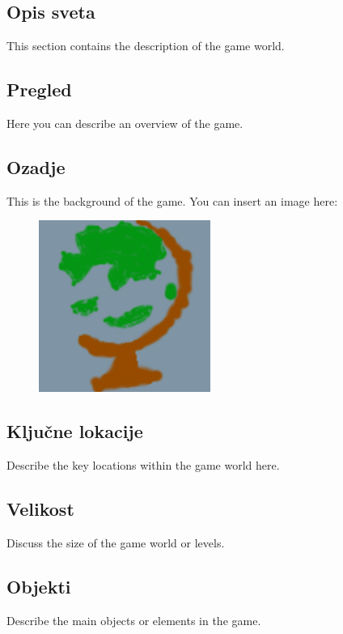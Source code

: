 \documentclass[a4paper, 12pt]{book}
\begin{document}
\subsection{Opis sveta}
\noindent This section contains the description of the game world.

\subsection{Pregled}
\noindent Here you can describe an overview of the game.

\subsection{Ozadje}
\noindent This is the background of the game. You can insert an image here:

\begin{figure}[h!]
    \centering
    \includegraphics[width=0.5\textwidth]{./slika.png}
\end{figure}

\subsection{Ključne lokacije}
\noindent Describe the key locations within the game world here.

\subsection{Velikost}
\noindent Discuss the size of the game world or levels.

\subsection{Objekti}
\noindent Describe the main objects or elements in the game.

\newpage
\end{document}
